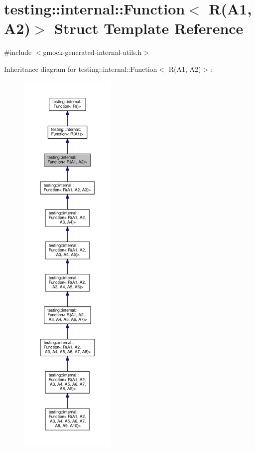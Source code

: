 \hypertarget{structtesting_1_1internal_1_1_function_3_01_r_07_a1_00_01_a2_08_4}{}\section{testing\+:\+:internal\+:\+:Function$<$ R(A1, A2)$>$ Struct Template Reference}
\label{structtesting_1_1internal_1_1_function_3_01_r_07_a1_00_01_a2_08_4}


{\ttfamily \#include $<$gmock-\/generated-\/internal-\/utils.\+h$>$}



Inheritance diagram for testing\+:\+:internal\+:\+:Function$<$ R(A1, A2)$>$\+:
\nopagebreak
\begin{figure}[H]
\begin{center}
\leavevmode
\includegraphics[height=550pt]{structtesting_1_1internal_1_1_function_3_01_r_07_a1_00_01_a2_08_4__inherit__graph}
\end{center}
\end{figure}


